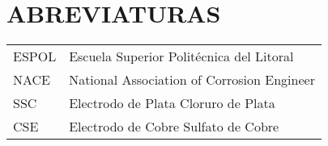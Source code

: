 \chapter{ABREVIATURAS}
\renewcommand{\arraystretch}{1.5}
\begin{table}[htbp]
\begin{tabular}{ll}
ESPOL & Escuela Superior Polit\'ecnica del Litoral   \\
NACE  & National Association of Corrosion Engineer \\
SSC   & Electrodo de Plata Cloruro de Plata        \\
CSE   & Electrodo de Cobre Sulfato de Cobre       
\end{tabular}
\end{table}
